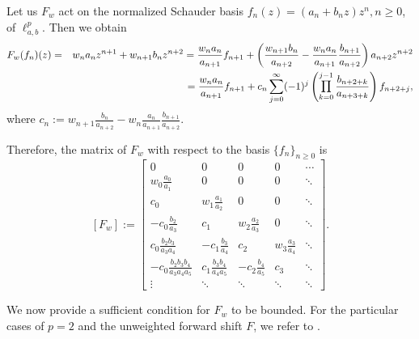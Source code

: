 \documentclass[12pt, reqno]{amsart}
\DeclareMathOperator*{\Mprod}{\text{\raisebox{0.25ex}{\scalebox{0.8}{$\prod$}}}}
\theoremstyle{definition}
\theoremstyle{remark}
\numberwithin{equation}{section}
\begin{document}
Let us $F_w$ act on the normalized Schauder basis $f_{n}(z) =(a_{n}+b_{n}z)z^{n},n \geq 0$, of $\ell^{p}_{a,b}$. Then we obtain
\begin{eqnarray*}
F_{w}(f_{n})(z)&=&w_{n}a_{n}z^{n+1}+w_{n+1}b_{n}z^{n+2}=\frac{w_{n}a_n}{a_{n+1}}f_{{n+1}} + \left(\frac{w_{n+1}b_{n}}{a_{n+2}}-\frac{w_{n}a_n}{a_{n+1}}\frac{b_{n+1}}{a_{n+2}}\right)a_{n+2} z^{n+2}\\& &\hskip 1.7cm =\frac{w_{n}a_n}{a_{n+1}}f_{{n+1}}+c_{n}\sum_{j=0}^{\infty}(-1)^{j}\left(\Mprod_{k=0}^{j-1}\frac{b_{n+2+k}}{a_{n+3+k}}\right)f_{n+2+j},
\end{eqnarray*}
where $c_{n}:=w_{n+1}\frac{b_{n}}{a_{n+2}}-w_{n}\frac{a_n}{a_{n+1}}\frac{b_{n+1}}{a_{n+2}}$.

\noindent Therefore, the matrix of $F_{w}$ with respect to the basis $\{f_{n}\}_{n\geq 0}$ is
$$[F_{w}]:=\begin{bmatrix}
0 & 0 & 0&0&\cdots\\
w_{0}\frac{a_{0}}{a_{1}} & 0 & 0&0&\ddots\\
c_{0} & w_{1}\frac{a_{1}}{a_{2}} & 0&0&\ddots\\
-c_{0}\frac{b_{2}}{a_{3}} & c_{1} & w_{2}\frac{a_{2}}{a_{3}}&0&\ddots\\
 c_{0}\frac{b_{2}b_{3}}{a_{3}a_{4}}& -c_{1}\frac{b_{3}}{a_{4}} & c_{2}&w_{3}\frac{a_{3}}{a_{4}}&\ddots\\
-c_{0}\frac{b_{2}b_{3}b_{4}}{a_{3}a_{4}a_{5}} & c_{1}\frac{b_{3}b_{4}}{a_{4}a_{5}} &-c_{2}\frac{b_{4}}{a_{5}} &c_{3}&\ddots\\
\vdots &\ddots&\ddots&\ddots&\ddots
\end{bmatrix}.$$

\noindent We now provide a sufficient condition for $F_{w}$ to be bounded. For the particular cases of $p=2$ and the unweighted forward shift $F$, we refer to \cite{Adams-McGuire}. 
\end{document}
